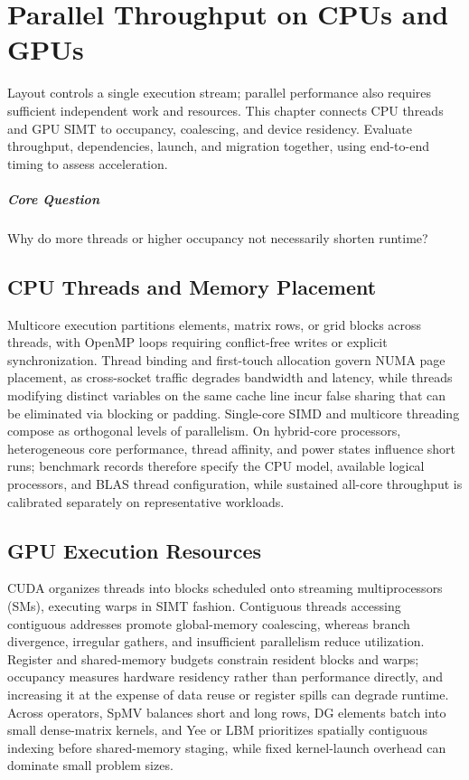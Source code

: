 \chapter{Parallel Throughput on CPUs and GPUs}\label{v0ch:27}
\begin{chaptersummary}
Layout controls a single execution stream; parallel performance also requires sufficient independent work and resources. This chapter connects CPU threads and GPU SIMT to occupancy, coalescing, and device residency. Evaluate throughput, dependencies, launch, and migration together, using end-to-end timing to assess acceleration.
\end{chaptersummary}
\paragraph{Core Question}Why do more threads or higher occupancy not necessarily shorten runtime?

\section{CPU Threads and Memory Placement}
Multicore execution partitions elements, matrix rows, or grid blocks across threads, with OpenMP loops requiring conflict-free writes or explicit synchronization. Thread binding and first-touch allocation govern NUMA page placement, as cross-socket traffic degrades bandwidth and latency, while threads modifying distinct variables on the same cache line incur false sharing that can be eliminated via blocking or padding. Single-core SIMD and multicore threading compose as orthogonal levels of parallelism.
On hybrid-core processors, heterogeneous core performance, thread affinity, and power states influence short runs; benchmark records therefore specify the CPU model, available logical processors, and BLAS thread configuration, while sustained all-core throughput is calibrated separately on representative workloads.
\section{GPU Execution Resources}
CUDA organizes threads into blocks scheduled onto streaming multiprocessors (SMs), executing warps in SIMT fashion.\cite{cuda}
Contiguous threads accessing contiguous addresses promote global-memory coalescing, whereas branch divergence, irregular gathers, and insufficient parallelism reduce utilization. Register and shared-memory budgets constrain resident blocks and warps; occupancy measures hardware residency rather than performance directly, and increasing it at the expense of data reuse or register spills can degrade runtime.
Across operators, SpMV balances short and long rows, DG elements batch into small dense-matrix kernels, and Yee or LBM prioritizes spatially contiguous indexing before shared-memory staging, while fixed kernel-launch overhead can dominate small problem sizes.
